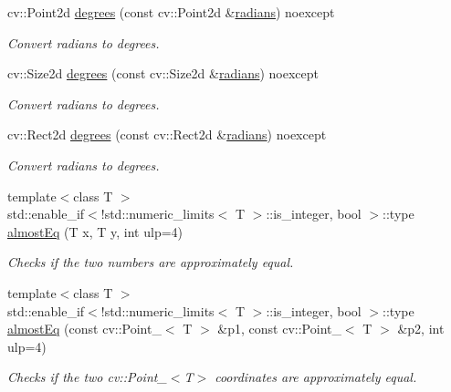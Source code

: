 \begin{DoxyCompactItemize}
cv\+::\+Point2d \hyperlink{group___utility_module_ga8ee006518e8f0489aa3e18166d74c6fe}{degrees} (const cv\+::\+Point2d \&\hyperlink{group___utility_module_ga547c4f80c778878854c572c297cc1983}{radians}) noexcept
\begin{DoxyCompactList}\small\item\em Convert radians to degrees. \end{DoxyCompactList}\item 
cv\+::\+Size2d \hyperlink{group___utility_module_gaa1f8aec2237eca2394ae5df2528e8eca}{degrees} (const cv\+::\+Size2d \&\hyperlink{group___utility_module_ga547c4f80c778878854c572c297cc1983}{radians}) noexcept
\begin{DoxyCompactList}\small\item\em Convert radians to degrees. \end{DoxyCompactList}\item 
cv\+::\+Rect2d \hyperlink{group___utility_module_ga1be3f98796bf80ec2aa5899e73269be7}{degrees} (const cv\+::\+Rect2d \&\hyperlink{group___utility_module_ga547c4f80c778878854c572c297cc1983}{radians}) noexcept
\begin{DoxyCompactList}\small\item\em Convert radians to degrees. \end{DoxyCompactList}\item 
{\footnotesize template$<$class T $>$ }\\std\+::enable\+\_\+if$<$!std\+::numeric\+\_\+limits$<$ T $>$\+::is\+\_\+integer, bool $>$\+::type \hyperlink{group___utility_module_gaab89548f655eaadb805d9099ea0ec616}{almost\+Eq} (T x, T y, int ulp=4)
\begin{DoxyCompactList}\small\item\em Checks if the two numbers are approximately equal. \end{DoxyCompactList}\item 
{\footnotesize template$<$class T $>$ }\\std\+::enable\+\_\+if$<$!std\+::numeric\+\_\+limits$<$ T $>$\+::is\+\_\+integer, bool $>$\+::type \hyperlink{group___utility_module_ga2096c3bec84b70855daa9399ec178fe2}{almost\+Eq} (const cv\+::\+Point\+\_\+$<$ T $>$ \&p1, const cv\+::\+Point\+\_\+$<$ T $>$ \&p2, int ulp=4)
\begin{DoxyCompactList}\small\item\em Checks if the two cv\+::\+Point\+\_\+$<$\+T$>$ coordinates are approximately equal. \end{DoxyCompactList}\item 

\end{DoxyCompactItemize}
